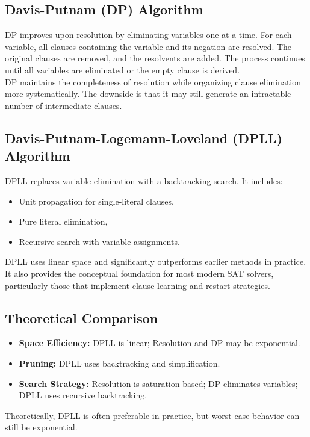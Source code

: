 \documentclass[11pt]{article}
\begin{document}
\subsection{Davis-Putnam (DP) Algorithm}
\hspace*{2em}
DP improves upon resolution by eliminating variables one at a time. For each variable, all clauses containing the variable and its negation are resolved. The original clauses are removed, and the resolvents are added. The process continues until all variables are eliminated or the empty clause is derived.\\
\hspace*{2em}
DP maintains the completeness of resolution while organizing clause elimination more systematically. The downside is that it may still generate an intractable number of intermediate clauses.

\subsection{Davis-Putnam-Logemann-Loveland (DPLL) Algorithm}
DPLL replaces variable elimination with a backtracking search. It includes:
\begin{itemize}
  \item Unit propagation for single-literal clauses,
  \item Pure literal elimination,
  \item Recursive search with variable assignments.
\end{itemize}
DPLL uses linear space and significantly outperforms earlier methods in practice. It also provides the conceptual foundation for most modern SAT solvers, particularly those that implement clause learning and restart strategies.

\subsection{Theoretical Comparison}
\begin{itemize}
  \item \textbf{Space Efficiency:} DPLL is linear; Resolution and DP may be exponential.
  \item \textbf{Pruning:} DPLL uses backtracking and simplification.
  \item \textbf{Search Strategy:} Resolution is saturation-based; DP eliminates variables; DPLL uses recursive backtracking.
\end{itemize}

Theoretically, DPLL is often preferable in practice, but worst-case behavior can still be exponential.
\end{document}
